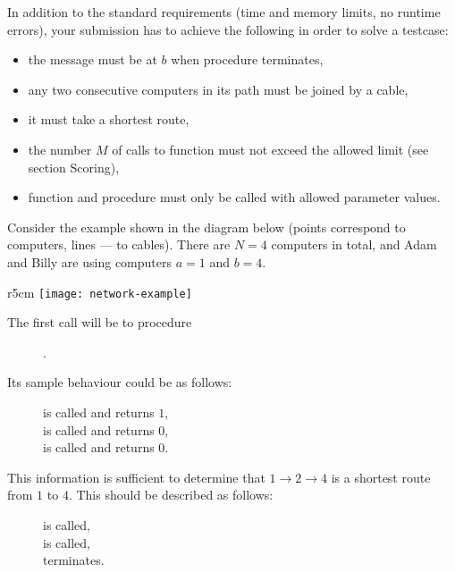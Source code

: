 \documentclass{boi2014}
\begin{document}
    In addition to the standard requirements (time and memory
    limits, no runtime errors), your submission has to achieve the following
    in order to solve a testcase:

    \begin{itemize}
        \item the message must be at $b$ when procedure 
            terminates,
        \item any two consecutive computers in its path must be joined
            by a cable,
        \item it must take a shortest route,
        \item the number $M$ of calls to function  must not
            exceed the allowed limit (see section Scoring),
        \item function  and procedure  must
            only be called with allowed parameter values.
    \end{itemize}

    \Example
    Consider the example shown in the diagram below (points correspond to
    computers, lines --- to cables). There are $N = 4$ computers in total,
    and Adam and Billy are using computers $a = 1$ and $b = 4$.

    \begin{wrapfigure}[1]{r}{5cm}
        \texttt{[image: network-example]}
    \end{wrapfigure}

    The first call will be to procedure
    \begin{figure}[H]
        \centering
        .
    \end{figure}

    Its sample behaviour could be as follows:

    \begin{figure}[H]
        \centering
         is called and returns $1$, \\
         is called and returns $0$, \\
         is called and returns $0$.
    \end{figure}

    This information is sufficient to determine that $1 \to 2 \to 4$ is a
    shortest route from $1$ to $4$. This should be described as follows:

    \begin{figure}[H]
        \centering
         is called, \\
         is called, \\
         terminates.
    \end{figure}
\end{document}
